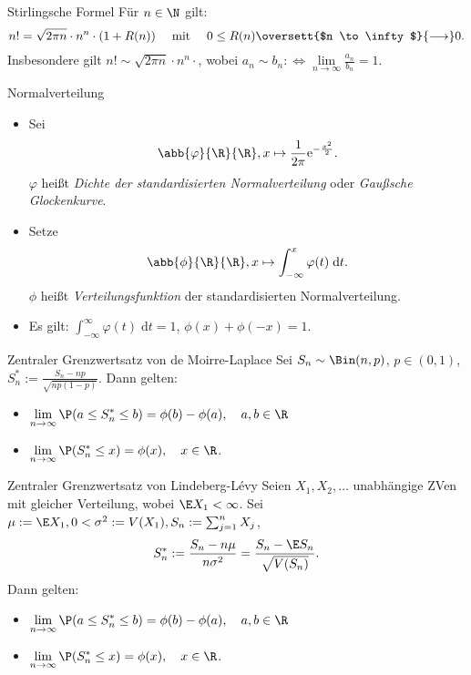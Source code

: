 \begin{karte}{Stirlingsche Formel}
	Für $n \in \N$ gilt:
	$$ n! = \sqrt{2\pi n}\cdot n^n \cdot (1+R(n)) \quad \text{ mit } \quad 0 \leq R(n) \oversett{$n \to \infty$}{\longrightarrow} 0.$$
	Insbesondere gilt $n! \sim \sqrt{2\pi n}\cdot n^n \cdot$, wobei $a_n \sim b_n :\Leftrightarrow \lim\limits_{n \to \infty}\frac{a_n}{b_n} = 1$.
\end{karte}

\begin{karte}{Normalverteilung}
	\begin{itemize}
		\item Sei $$\abb{\varphi}{\R}{\R}, x \mapsto \frac{1}{2\pi}\mathrm{e}^{-\frac{x^2}{2}}.$$ $\varphi$ heißt \textit{Dichte der standardisierten Normalverteilung} oder \textit{Gaußsche Glockenkurve}. 
		\item Setze $$\abb{\phi}{\R}{\R}, x \mapsto \int_{-\infty}^{x} \varphi(t) \; \mathrm{d}t.$$ $\phi$ heißt \textit{Verteilungsfunktion} der standardisierten Normalverteilung.
		\item Es gilt: $ \displaystyle \int_{-\infty}^{\infty} \varphi(t) \; \mathrm{d}t = 1$, $\phi(x)+\phi(-x)=1$.
	\end{itemize}
\end{karte}

\begin{karte}{Zentraler Grenzwertsatz von de Moirre-Laplace}
	Sei $S_n \sim \Bin(n,p)$, $p \in (0,1)$, $S_n^\ast := \frac{S_n-np}{\sqrt{np(1-p)}}$. Dann gelten:
	\begin{itemize}
		\item $\displaystyle \lim\limits_{n \to \infty} \P(a \leq S_n^\ast \leq b) = \phi(b)-\phi(a), \quad a,b \in \R$
		\item $\displaystyle \lim\limits_{n \to \infty} \P(S_n^\ast \leq x) = \phi(x), \quad x \in \R$.
	\end{itemize}
\end{karte}

\begin{karte}{Zentraler Grenzwertsatz von Lindeberg-Lévy}
	Seien $X_1,X_2,\dotsc$ unabhängige ZVen mit gleicher Verteilung, wobei $\E X_1 < \infty$. Sei $\mu := \E X_1, 0 < \sigma^2 := V(X_1), S_n := \sum_{j=1}^{n} X_j$, $$S_n^\ast := \frac{S_n-n\mu}{n\sigma^2} = \frac{S_n-\E S_n}{\sqrt{V(S_n)}}.$$
	Dann gelten:
	\begin{itemize}
		\item $\displaystyle \lim\limits_{n \to \infty} \P(a \leq S_n^\ast \leq b) = \phi(b)-\phi(a), \quad a,b \in \R$
		\item $\displaystyle \lim\limits_{n \to \infty} \P(S_n^\ast \leq x) = \phi(x), \quad x \in \R$.
	\end{itemize}
\end{karte}